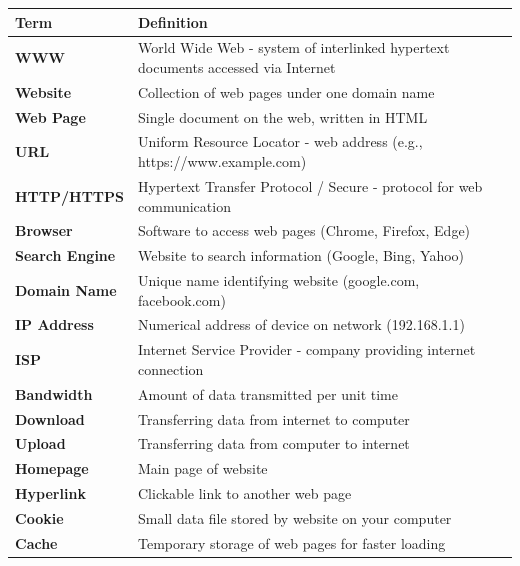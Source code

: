 \documentclass[12pt,a4paper]{article}
\begin{document}
\begin{longtable}{|p{3.5cm}|p{9.5cm}|}
\hline
\textbf{Term} & \textbf{Definition} \\
\hline
\endhead

\textbf{WWW} & World Wide Web - system of interlinked hypertext documents accessed via Internet \\
\hline

\textbf{Website} & Collection of web pages under one domain name \\
\hline

\textbf{Web Page} & Single document on the web, written in HTML \\
\hline

\textbf{URL} & Uniform Resource Locator - web address (e.g., https://www.example.com) \\
\hline

\textbf{HTTP/HTTPS} & Hypertext Transfer Protocol / Secure - protocol for web communication \\
\hline

\textbf{Browser} & Software to access web pages (Chrome, Firefox, Edge) \\
\hline

\textbf{Search Engine} & Website to search information (Google, Bing, Yahoo) \\
\hline

\textbf{Domain Name} & Unique name identifying website (google.com, facebook.com) \\
\hline

\textbf{IP Address} & Numerical address of device on network (192.168.1.1) \\
\hline

\textbf{ISP} & Internet Service Provider - company providing internet connection \\
\hline

\textbf{Bandwidth} & Amount of data transmitted per unit time \\
\hline

\textbf{Download} & Transferring data from internet to computer \\
\hline

\textbf{Upload} & Transferring data from computer to internet \\
\hline

\textbf{Homepage} & Main page of website \\
\hline

\textbf{Hyperlink} & Clickable link to another web page \\
\hline

\textbf{Cookie} & Small data file stored by website on your computer \\
\hline

\textbf{Cache} & Temporary storage of web pages for faster loading \\
\hline

\end{longtable}
\end{document}
